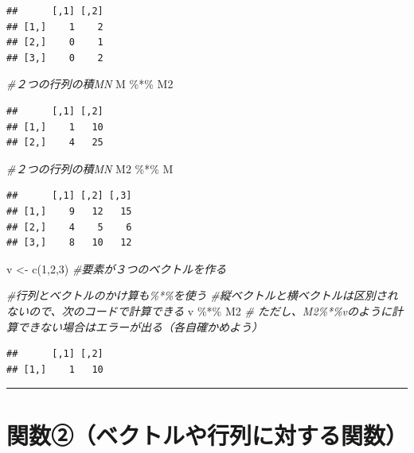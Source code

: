 \documentclass[
]{book}
\newenvironment{Shaded}{\begin{snugshade}}{\end{snugshade}}
\newcommand{\CommentTok}[1]{\textcolor[rgb]{0.56,0.35,0.01}{\textit{#1}}}
\newcommand{\DecValTok}[1]{\textcolor[rgb]{0.00,0.00,0.81}{#1}}
\newcommand{\FunctionTok}[1]{\textcolor[rgb]{0.00,0.00,0.00}{#1}}
\newcommand{\NormalTok}[1]{#1}
\newcommand{\OtherTok}[1]{\textcolor[rgb]{0.56,0.35,0.01}{#1}}
\newcommand{\SpecialCharTok}[1]{\textcolor[rgb]{0.00,0.00,0.00}{#1}}
\begin{document}
\begin{verbatim}
##      [,1] [,2]
## [1,]    1    2
## [2,]    0    1
## [3,]    0    2
\end{verbatim}

\begin{Shaded}
\begin{Highlighting}[]
\CommentTok{\#２つの行列の積MN}
\NormalTok{M }\SpecialCharTok{\%*\%}\NormalTok{ M2 }
\end{Highlighting}
\end{Shaded}

\begin{verbatim}
##      [,1] [,2]
## [1,]    1   10
## [2,]    4   25
\end{verbatim}

\begin{Shaded}
\begin{Highlighting}[]
\CommentTok{\#２つの行列の積MN}
\NormalTok{M2 }\SpecialCharTok{\%*\%}\NormalTok{ M　}
\end{Highlighting}
\end{Shaded}

\begin{verbatim}
##      [,1] [,2] [,3]
## [1,]    9   12   15
## [2,]    4    5    6
## [3,]    8   10   12
\end{verbatim}

\begin{Shaded}
\begin{Highlighting}[]
\NormalTok{v }\OtherTok{\textless{}{-}} \FunctionTok{c}\NormalTok{(}\DecValTok{1}\NormalTok{,}\DecValTok{2}\NormalTok{,}\DecValTok{3}\NormalTok{) }\CommentTok{\#要素が３つのベクトルを作る}

\CommentTok{\#行列とベクトルのかけ算も\%*\%を使う}
\CommentTok{\#縦ベクトルと横ベクトルは区別されないので、次のコードで計算できる}
\NormalTok{v }\SpecialCharTok{\%*\%}\NormalTok{ M2 }\CommentTok{\# ただし、M2\%*\%vのように計算できない場合はエラーが出る（各自確かめよう）}
\end{Highlighting}
\end{Shaded}

\begin{verbatim}
##      [,1] [,2]
## [1,]    1   10
\end{verbatim}

\begin{center}\rule{0.5\linewidth}{0.5pt}\end{center}

\hypertarget{ux95a2ux6570ux2461ux30d9ux30afux30c8ux30ebux3084ux884cux5217ux306bux5bfeux3059ux308bux95a2ux6570}{%
\section{関数②（ベクトルや行列に対する関数）}\label{ux95a2ux6570ux2461ux30d9ux30afux30c8ux30ebux3084ux884cux5217ux306bux5bfeux3059ux308bux95a2ux6570}}
\end{document}
